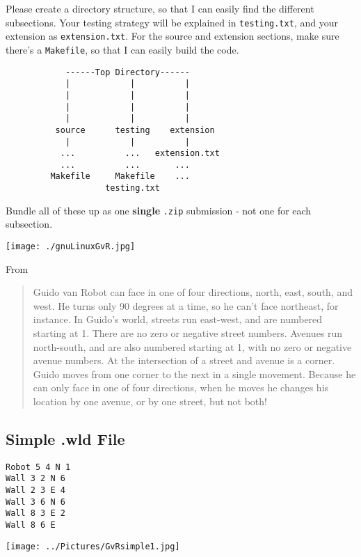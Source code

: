 \begin{exercise}
Please create a directory structure, so that I can easily find the
different subsections.  Your testing strategy will be explained in
\verb^testing.txt^, and your extension as \verb^extension.txt^. For
the source and extension sections, make sure there's a
\verb^Makefile^, so that I can easily build the code.

\begin{verbatim}
            ------Top Directory------
            |            |          |           
            |            |          |           
            |            |          |            
            |            |          |             
          source      testing    extension   
            |            |          |
           ...          ...   extension.txt
           ...          ...       ...
         Makefile     Makefile    ...  
                    testing.txt
\end{verbatim}

Bundle all of these up as one {\bf single} \verb^.zip^ submission -
not one for each subsection.
\end{exercise}


\begin{center}
\texttt{[image: ./gnuLinuxGvR.jpg]}
\end{center}

From 
{\small
\begin{quote}
Guido van Robot can face in one of four directions, north, east, south, and west. He turns only 90 degrees at a time, so he can't face northeast, for instance. In Guido's world, streets run east-west, and are numbered starting at 1. There are no zero or negative street numbers. Avenues run north-south, and are also numbered starting at 1, with no zero or negative avenue numbers. At the intersection of a street and avenue is a corner. Guido moves from one corner to the next in a single movement. Because he can only face in one of four directions, when he moves he changes his location by one avenue, or by one street, but not both!
\end{quote}
}

\subsection*{Simple .wld File}

\begin{verbatim}
Robot 5 4 N 1
Wall 3 2 N 6
Wall 2 3 E 4
Wall 3 6 N 6
Wall 8 3 E 2
Wall 8 6 E
\end{verbatim}
\begin{center}
\texttt{[image: ../Pictures/GvRsimple1.jpg]}
\end{center}

